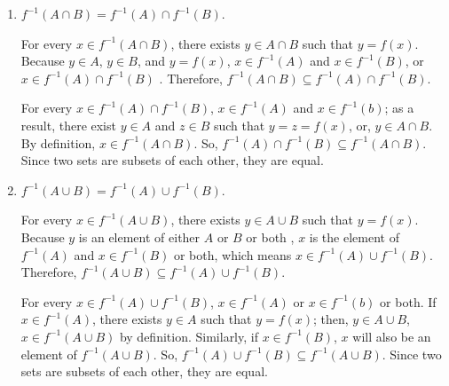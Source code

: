 \begin{exercise}{8}
  \begin{enumerate}
    \item $f^{-1}(A \cap B) = f^{-1}(A) \cap f^{-1}(B)$.

    \Proof{} For every $x \in f^{-1}(A \cap B)$, there exists $y \in A \cap B$
    such that $y = f(x)$. Because $y \in A$, $y \in B$, and $y = f(x)$,
    $x \in f^{-1}(A)$ and $x \in f^{-1}(B)$, or $x \in f^{-1}(A) \cap f^{-1}(B)$
    . Therefore, $f^{-1}(A \cap B) \subseteq f^{-1}(A) \cap f^{-1}(B)$.

    For every $x \in f^{-1}(A) \cap f^{-1}(B)$, $x \in f^{-1}(A)$ and
    $x \in f^{-1}(b)$; as a result, there exist $y \in A$ and $z \in B$ such
    that $y = z = f(x)$, or, $y \in A \cap B$. By definition, $x \in f^{-1}(A \cap B)$.
    So, $f^{-1}(A) \cap f^{-1}(B) \subseteq f^{-1}(A \cap B)$. Since two sets
    are subsets of each other, they are equal. \QED

    \item $f^{-1}(A \cup B) = f^{-1}(A) \cup f^{-1}(B)$.

    \Proof{} For every $x \in f^{-1}(A \cup B)$, there exists $y \in A \cup B$
    such that $y = f(x)$. Because $y$ is an element of either $A$ or $B$ or both
    , $x$ is the element of $f^{-1}(A)$ and $x \in f^{-1}(B)$ or both, which
    means $x \in f^{-1}(A) \cup f^{-1}(B)$. Therefore, $f^{-1}(A \cup B) \subseteq f^{-1}(A) \cup f^{-1}(B)$.

    For every $x \in f^{-1}(A) \cup f^{-1}(B)$, $x \in f^{-1}(A)$ or
    $x \in f^{-1}(b)$ or both. If $x \in f^{-1}(A)$, there exists $y \in A$
    such that $y = f(x)$; then, $y \in A \cup B$, $x \in f^{-1}(A \cup B)$ by
    definition. Similarly, if $x \in f^{-1}(B)$, $x$ will also be an element of
    $f^{-1}(A \cup B)$. So, $f^{-1}(A) \cup f^{-1}(B) \subseteq f^{-1}(A \cup B)$.
    Since two sets are subsets of each other, they are equal. \QED
  \end{enumerate}
\end{exercise}

